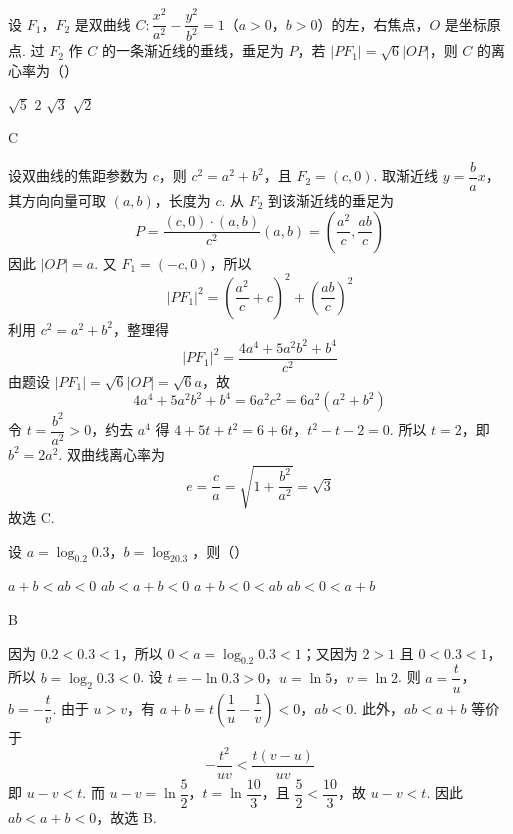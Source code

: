 \begin{problem}
设 \(F_1\)，\(F_2\) 是双曲线 \(C:\dfrac{x^2}{a^2}-\dfrac{y^2}{b^2}=1\)（\(a>0\)，\(b>0\)）的左，右焦点，\(O\) 是坐标原点. 过 \(F_2\) 作 \(C\) 的一条渐近线的垂线，垂足为 \(P\)，若 \(\left|PF_1\right|=\sqrt6|OP|\)，则 \(C\) 的离心率为（\quad）

\choices
    {\(\sqrt5\)}
    {\(2\)}
    {\(\sqrt3\)}
    {\(\sqrt2\)}
\end{problem}

\begin{answer}
C
\end{answer}

\begin{solution}
设双曲线的焦距参数为 \(c\)，则 \(c^2=a^2+b^2\)，且 \(F_2=(c,0)\). 取渐近线 \(y=\dfrac ba x\)，其方向向量可取 \((a,b)\)，长度为 \(c\). 从 \(F_2\) 到该渐近线的垂足为
\[
P=\dfrac{(c,0)\cdot(a,b)}{c^2}(a,b)=\left(\dfrac{a^2}{c},\dfrac{ab}{c}\right)
\]
因此 \(|OP|=a\). 又 \(F_1=(-c,0)\)，所以
\[
|PF_1|^2=\left(\dfrac{a^2}{c}+c\right)^2+\left(\dfrac{ab}{c}\right)^2
\]
利用 \(c^2=a^2+b^2\)，整理得
\[
|PF_1|^2=\dfrac{4a^4+5a^2b^2+b^4}{c^2}
\]
由题设 \(|PF_1|=\sqrt6|OP|=\sqrt6a\)，故
\[
4a^4+5a^2b^2+b^4=6a^2c^2=6a^2(a^2+b^2)
\]
令 \(t=\dfrac{b^2}{a^2}>0\)，约去 \(a^4\) 得
\(4+5t+t^2=6+6t\)，\(t^2-t-2=0\).
所以 \(t=2\)，即 \(b^2=2a^2\). 双曲线离心率为
\[
e=\dfrac ca=\sqrt{1+\dfrac{b^2}{a^2}}=\sqrt3
\]
故选 C.
\end{solution}

\begin{problem}
设 \(a=\log_{0.2}0.3\)，\(b=\log_20.3\)，则（\quad）

\choices
    {\(a+b<ab<0\)}
    {\(ab<a+b<0\)}
    {\(a+b<0<ab\)}
    {\(ab<0<a+b\)}
\end{problem}

\begin{answer}
B
\end{answer}

\begin{solution}
因为 \(0.2<0.3<1\)，所以 \(0<a=\log_{0.2}0.3<1\)；又因为 \(2>1\) 且 \(0<0.3<1\)，所以 \(b=\log_2 0.3<0\). 设
\(t=-\ln0.3>0\)，\(u=\ln5\)，\(v=\ln2\).
则 \(a=\dfrac tu\)，\(b=-\dfrac tv\). 由于 \(u>v\)，有
\(a+b=t\left(\dfrac1u-\dfrac1v\right)<0\)，\(ab<0\).
此外，\(ab<a+b\) 等价于
\[
-\dfrac{t^2}{uv}<\dfrac{t(v-u)}{uv}
\]
即 \(u-v<t\). 而 \(u-v=\ln\dfrac52\)，\(t=\ln\dfrac{10}{3}\)，且 \(\dfrac52<\dfrac{10}{3}\)，故 \(u-v<t\). 因此 \(ab<a+b<0\)，故选 B.
\end{solution}

